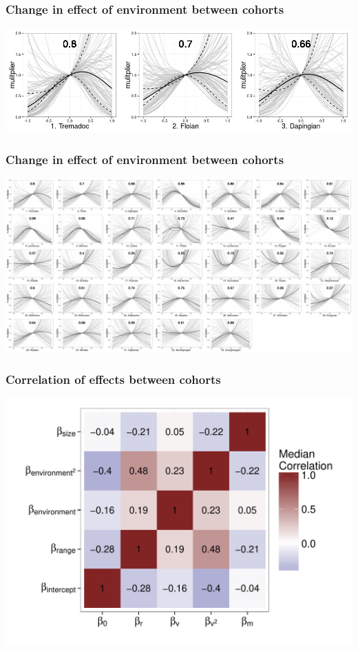 \documentclass{beamer}
\begin{document}
\begin{frame}
  \frametitle{Change in effect of environment between cohorts}

  \includegraphics[width = \textwidth,height = \textheight,keepaspectratio = true]{figure/cohort_quads_short}
\end{frame}

\begin{frame}
  \frametitle{Change in effect of environment between cohorts}

  \includegraphics[width = \textwidth,height = \textheight,keepaspectratio = true]{figure/cohort_quads}
\end{frame}

\begin{frame}
  \frametitle{Correlation of effects between cohorts}

  \begin{center}
    \includegraphics[width = \textwidth,height = 0.9\textheight,keepaspectratio = true]{figure/wei_cor_heatmap}
  \end{center}
\end{frame}
\end{document}
